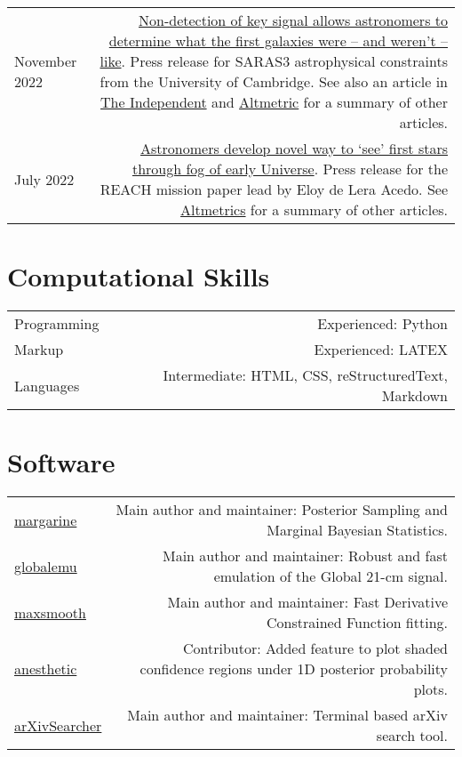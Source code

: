 \documentclass{article}
\begin{document}
\begin{tabular}{L!{\vrule}R}
	November 2022 & \href{https://www.cam.ac.uk/research/news/non-detection-of-key-signal-allows-astronomers-to-determine-what-the-first-galaxies-were-and-werent}{Non-detection of key signal allows astronomers to determine what the first galaxies were – and weren’t – like}. Press release for SARAS3 astrophysical constraints from the University of Cambridge. See also an article in \href{https://www.independent.co.uk/space/galaxies-beginning-cosmic-dawn-signal-b2234570.html?amp}{The Independent} and \href{https://nature.altmetric.com/details/139089769/news}{Altmetric} for a summary of other articles. \\
	July 2022 & \href{https://www.cam.ac.uk/research/news/astronomers-develop-novel-way-to-see-the-first-stars-through-the-fog-of-the-early-universe}{Astronomers develop novel way to ‘see’ first stars through fog of early Universe}. Press release for the REACH mission paper lead by Eloy de Lera Acedo. See \href{https://nature.altmetric.com/details/132932581/news}{Altmetrics} for a summary of other articles.
\end{tabular}

\section*{Computational Skills}

\begin{tabular}{L!{\vrule}R}
	Programming & Experienced: Python \\
	Markup & Experienced: LATEX \\
	Languages & Intermediate: HTML, CSS, reStructuredText, Markdown
\end{tabular}

\section*{Software}

\begin{tabular}{L!{\vrule}R}
	\href{https://github.com/htjb/margarine}{margarine} & Main author and maintainer: Posterior Sampling and Marginal Bayesian Statistics. \\
	\href{https://github.com/htjb/globalemu}{globalemu} & Main author and maintainer: Robust and fast emulation of the Global 21-cm signal.\\
	\href{https://github.com/htjb/maxsmooth}{maxsmooth} & Main author and maintainer: Fast Derivative Constrained Function fitting.\\
	\href{https://github.com/williamjameshandley/anesthetic}{anesthetic} & Contributor: Added feature to plot shaded confidence regions under 1D posterior probability plots.\\
	\href{https://github.com/htjb/arXivSearcher}{arXivSearcher} & Main author and maintainer: Terminal based arXiv search tool.
\end{tabular}
\end{document}
